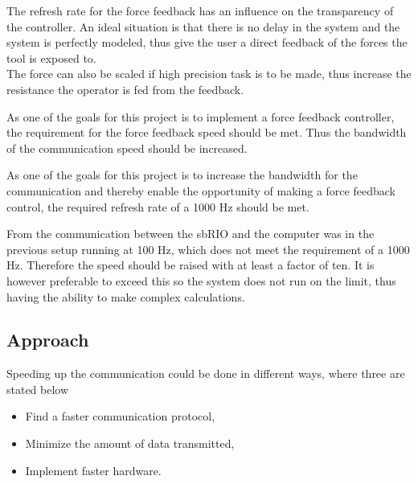 
The refresh rate for the force feedback has an influence on the transparency of the controller. An ideal situation is that there is no delay in the system and the system is perfectly modeled, thus give the user a direct feedback of the forces the tool is exposed to.\\ 
The force can also be scaled if high precision task is to be made, thus increase the resistance the operator is fed from the feedback.

{\color{green}
As one of the goals for this project is to implement a force feedback controller, the requirement for the force feedback speed should be met. Thus the bandwidth of the communication speed should be increased.
} 

{\color{red} 
As one of the goals for this project is to increase the bandwidth for the communication and thereby enable the opportunity of making a force feedback control, the required refresh rate of a 1000 Hz should be met.
}

From  the communication between the sbRIO and the computer was in the previous setup running at 100 Hz, which does not meet the requirement of a 1000 Hz. Therefore the speed should be raised with at least a factor of ten. It is however preferable to exceed this so the system does not run on the limit, thus having the ability to make complex calculations.


\subsection*{Approach}
Speeding up the communication could be done in different ways, where three are stated below

\begin{itemize}
	\item Find a faster communication protocol,
	\item Minimize the amount of data transmitted,
	\item Implement faster hardware.	
\end{itemize}

